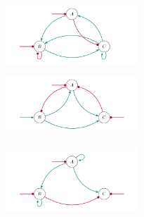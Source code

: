 \documentclass[varwidth=18cm, border=10pt]{standalone}
\begin{document}
\begin{figure}
\begin{subfigure}{6cm}
\caption{}
\end{subfigure}
\begin{subfigure}{6cm}
\centering\includegraphics[width=5cm]{oopmppmpmmppo.pdf}
\caption{}
\end{subfigure}
\begin{subfigure}{6cm}
\centering\includegraphics[width=5cm]{opmmpmoopppom.pdf}
\caption{}
\end{subfigure}
\begin{subfigure}{6cm}
\centering\includegraphics[width=5cm]{poompppompmom.pdf}
\caption{}
\end{subfigure}
\end{figure}
\end{document}
